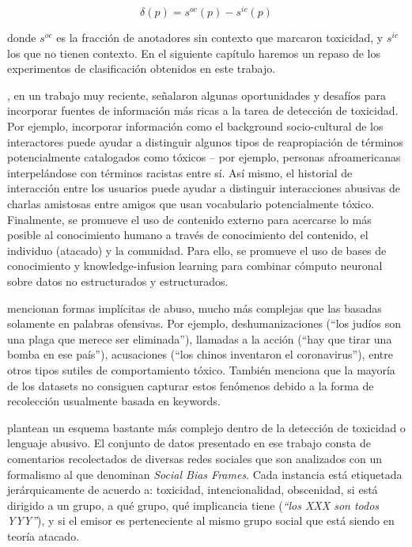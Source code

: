 \begin{equation}
    \delta(p) = s^{oc}(p) - s^{ic}(p)
\end{equation}

\noindent donde $s^{oc}$ es la fracción de anotadores sin contexto que marcaron toxicidad, y $s^{ic}$ los que no tienen contexto. En el siguiente capítulo haremos un repaso de los experimentos de clasificación obtenidos en este trabajo.

\citet{sheth2021defining}, en un trabajo muy reciente, señalaron algunas oportunidades y desafíos para incorporar fuentes de información más ricas a la tarea de detección de toxicidad. Por ejemplo, incorporar información como el background socio-cultural de los interactores puede ayudar a distinguir algunos tipos de reapropiación de términos potencialmente catalogados como tóxicos -- por ejemplo, personas afroamericanas interpelándose con términos racistas entre sí. Así mismo, el historial de interacción entre los usuarios puede ayudar a distinguir interacciones abusivas de charlas amistosas entre amigos que usan vocabulario potencialmente tóxico. Finalmente, se promueve el uso de contenido externo para acercarse lo más posible al conocimiento humano a través de conocimiento del contenido, el individuo (atacado) y la comunidad. Para ello, se promueve el uso de bases de conocimiento y knowledge-infusion learning \cite{gaur2020infusion} para combinar cómputo neuronal sobre datos no estructurados y estructurados.



\citet{wiegand2021implicitly} mencionan formas implícitas de abuso, mucho más complejas que las basadas solamente en palabras ofensivas. Por ejemplo, deshumanizaciones (``los judíos son una plaga que merece ser eliminada''), llamadas a la acción (``hay que tirar una bomba en ese país''), acusaciones (``los chinos inventaron el coronavirus''), entre otros tipos sutiles de comportamiento tóxico. También menciona que la mayoría de los datasets no consiguen capturar estos fenómenos debido a la forma de recolección usualmente basada en keywords.

\citet{sap2020social} plantean un esquema bastante más complejo dentro de la detección de toxicidad o lenguaje abusivo. El conjunto de datos presentado en ese trabajo consta de comentarios recolectados de diversas redes sociales que son analizados con un formalismo al que denominan \emph{Social Bias Frames}. Cada instancia está etiquetada jerárquicamente de acuerdo a: toxicidad, intencionalidad, obscenidad, si está dirigido a un grupo, a qué grupo, qué implicancia tiene (\emph{``los XXX son todos YYY''}), y si el emisor es perteneciente al mismo grupo social que está siendo en teoría atacado.

